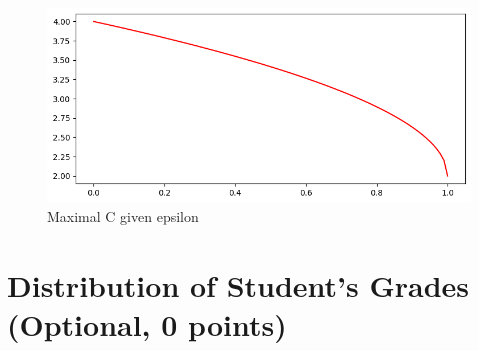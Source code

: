 \documentclass[a4paper,12pt]{article}
\begin{document}
\begin{figure}[htbp]
    \centering
    \includegraphics[width=0.5\linewidth]{4_3_a.png}
    \caption{Maximal C given epsilon} %
    \label{fig:1}
\end{figure}



\section{Distribution of Student's Grades (Optional, 0 points)}

\end{document}
